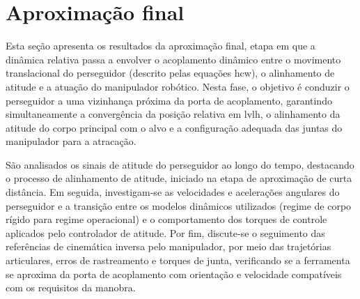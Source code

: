 \section{Aproximação final}
\label{sec_cap4_app_final}

Esta seção apresenta os resultados da aproximação final, etapa em que a dinâmica relativa passa a envolver o acoplamento dinâmico entre o movimento translacional do perseguidor (descrito pelas equações \gls{hcw}), o alinhamento de atitude e a atuação do manipulador robótico.
Nesta fase, o objetivo é conduzir o perseguidor a uma vizinhança próxima da porta de acoplamento, garantindo simultaneamente a convergência da posição relativa em \gls{lvlh}, o alinhamento da atitude do corpo principal com o alvo e a configuração adequada das juntas do manipulador para a atracação.

São analisados os sinais de atitude do perseguidor ao longo do tempo, destacando o processo de alinhamento de atitude, iniciado na etapa de aproximação de curta distância.
Em seguida, investigam-se as velocidades e acelerações angulares do perseguidor e a transição entre os modelos dinâmicos utilizados (regime de corpo rígido para regime operacional) e o comportamento dos torques de controle aplicados pelo controlador de atitude.
Por fim, discute-se o seguimento das referências de cinemática inversa pelo manipulador, por meio das trajetórias articulares, erros de rastreamento e torques de junta, verificando se a ferramenta se aproxima da porta de acoplamento com orientação e velocidade compatíveis com os requisitos da manobra.






